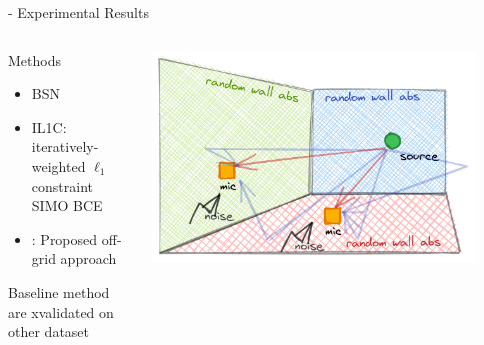 \begin{frame}[t]{\blaster - Experimental Results}
    \begin{columns}[onlytextwidth]
        \begin{column}{0.45\textwidth}
            \begin{block}{Methods}
                \begin{itemize}
                    \item BSN \cite{lin2007blind}
                    \item IL1C: iteratively-weighted $\ell_1$ constraint SIMO BCE
                    \\\cite{crocco2015room}
                    \item \blaster: Proposed off-grid approach
                \end{itemize}
            Baseline method are xvalidated on other dataset
            \end{block}
        \end{column}

        \begin{column}{0.45\textwidth}
            \includegraphics[width=0.9\textwidth]{figures/aer_scenario4.png}
        \end{column}
    \end{columns}



\end{frame}
